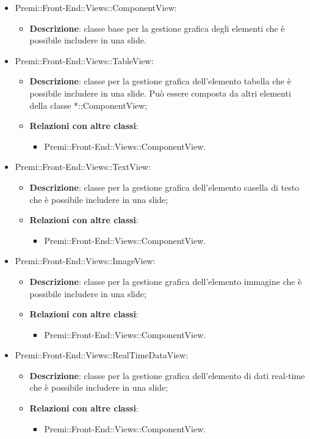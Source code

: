 \begin{itemize}
		\item Premi::Front-End::Views::ComponentView:
		\begin{itemize}
			\item \textbf{Descrizione}: classe base per la gestione grafica degli elementi che è possibile includere in una \gls{slide}.
		\end{itemize}

		\item Premi::Front-End::Views::TableView:
		\begin{itemize}
			\item \textbf{Descrizione}: classe per la gestione grafica dell'elemento tabella che è possibile includere in una \gls{slide}. Può essere composta da altri elementi della classe *::ComponentView;
			\item \textbf{Relazioni con altre classi}:
			\begin{itemize}
				\item Premi::Front-End::Views::ComponentView.
			\end{itemize}
		\end{itemize}


		\item Premi::Front-End::Views::TextView:
		\begin{itemize}
			\item \textbf{Descrizione}: classe per la gestione grafica dell'elemento casella di testo che è possibile includere in una \gls{slide};
			\item \textbf{Relazioni con altre classi}:
			\begin{itemize}
				\item Premi::Front-End::Views::ComponentView.
			\end{itemize}
		\end{itemize}

		\item Premi::Front-End::Views::ImageView:
		\begin{itemize}
			\item \textbf{Descrizione}: classe per la gestione grafica dell'elemento immagine che è possibile includere in una \gls{slide};
			\item \textbf{Relazioni con altre classi}:
			\begin{itemize}
				\item Premi::Front-End::Views::ComponentView.
			\end{itemize}
		\end{itemize}

		\item Premi::Front-End::Views::RealTimeDataView:
		\begin{itemize}
			\item \textbf{Descrizione}: classe per la gestione grafica dell'elemento di dati real-time che è possibile includere in una \gls{slide};
			\item \textbf{Relazioni con altre classi}:
			\begin{itemize}
				\item Premi::Front-End::Views::ComponentView.
			\end{itemize}
		\end{itemize}


\end{itemize}

